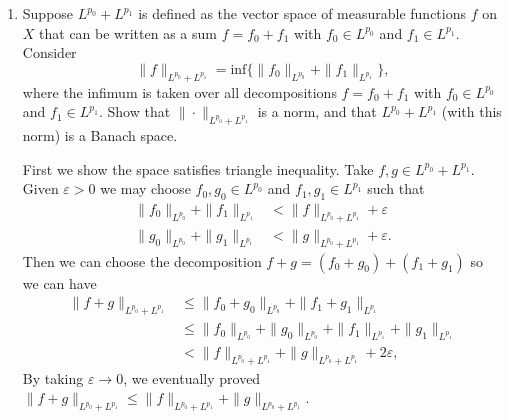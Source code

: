 \documentclass{article}
\begin{document}
\begin{enumerate}
\begin{enumerate}
\begin{solution}
            Now we have $f_{n_k}-f\to 0$ a.e. on $X$. Using a similar argument we have for both $p=p_0$ and $p=p_1$:
            $$\abs{f(x) - S_Kf(x)}^p \leq 2^{p+1} \abs{g(x)} ^p.$$
            Using the Dominated Convergence Theorem, both $\|f_{n_k}-f\|_{L^{p_0}}$ and $\|f_{n_k}-f\|_{L^{p_1}}$ converges to $0$, so as
            $\|f_{n_k}-f\|_{L^{p_0}\cap L^{p_1}}$.

            Since $\{f_n\}_{n\geq 1}$ is Cauchy, we can very easily show $f_n\to f$ in $L^{p_0}\cap L^{p_1}$ (with that norm).
        \end{solution}

        \item Suppose $L^{p_0} + L^{p_1}$ is defined as the vector space of measurable functions $f$ on $X$ that can be written as a sum
        $f=f_0+f_1$ with $f_0\in L^{p_0}$ and $f_1\in L^{p_1}$. Consider
        $$\|f\|_{L^{p_0} + L^{p_1}} = \text{inf}\{\|f_0\|_{L^{p_0}} + \|f_1\|_{L^{p_1}}\},$$
        where the infimum is taken over all decompositions $f=f_0+f_1$ with $f_0\in L^{p_0}$ and $f_1\in L^{p_1}$.
        Show that $\|\cdot\|_{L^{p_0} + L^{p_1}}$ is a norm, and that $L^{p_0} + L^{p_1}$ (with this norm) is a Banach space.

        \begin{solution}
            First we show the space satisfies triangle inequality. Take $f,g\in L^{p_0} + L^{p_1}$. Given $\varepsilon>0$ we may choose $f_0,g_0\in L^{p_0}$
            and $f_1, g_1\in L^{p_1}$ such that
            \begin{align*}
                \|f_0\|_{L^{p_0}} + \|f_1\|_{L^{p_1}} &< \|f\|_{L^{p_0}+L^{p_1}} + \varepsilon\\
                \|g_0\|_{L^{p_0}} + \|g_1\|_{L^{p_1}} &< \|g\|_{L^{p_0}+L^{p_1}} + \varepsilon.
            \end{align*}
            Then we can choose the decomposition $f+g=(f_0+g_0) + (f_1+g_1)$ so we can have
            \begin{align*}
                \|f+g\|_{L^{p_0}+L^{p_1}} &\leq \|f_0+g_0\|_{L^{p_0}} + \|f_1+g_1\|_{L^{p_1}}\\
                &\leq \|f_0\|_{L^{p_0}} + \|g_0\|_{L^{p_0}} + \|f_1\|_{L^{p_1}} + \|g_1\|_{L^{p_1}}\\
                &< \|f\|_{L^{p_0}+L^{p_1}} + \|g\|_{L^{p_0}+L^{p_1}} + 2\varepsilon,
            \end{align*}
            By taking $\varepsilon\to 0$, we eventually proved $\|f+g\|_{L^{p_0}+L^{p_1}} \leq \|f\|_{L^{p_0}+L^{p_1}} + \|g\|_{L^{p_0}+L^{p_1}}$.


\end{solution}
\end{enumerate}
\end{enumerate}
\end{document}
